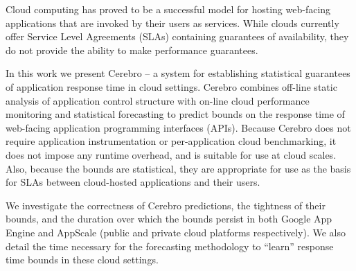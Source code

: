 Cloud computing has proved to be a successful model for hosting web-facing
applications that are invoked by their users as services.  While clouds
currently offer Service Level Agreements (SLAs) containing guarantees of
availability, they do not provide the ability to make performance
guarantees.

In this work we present Cerebro -- a system for establishing statistical
guarantees of application response time in cloud settings.  Cerebro combines
off-line static analysis of application control structure with on-line cloud
performance monitoring and statistical forecasting to predict bounds on the
response time of web-facing application programming interfaces (APIs).
Because Cerebro does not require application instrumentation or 
per-application cloud benchmarking, it does not impose any runtime overhead,
and is suitable for use at cloud scales.  Also, because the bounds are
statistical, they are appropriate for use as the basis for SLAs between
cloud-hosted applications and their users.

We investigate the correctness of Cerebro predictions, the tightness of their
bounds, and the duration over which the bounds persist in both Google App
Engine and AppScale (public and private cloud platforms respectively).  
We also detail the time necessary for the forecasting 
methodology to ``learn'' response time bounds in these cloud settings. 


